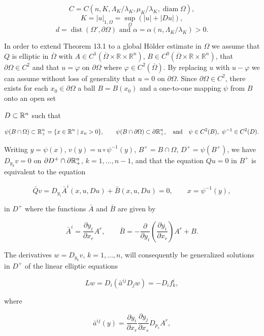 \[
C=C(n,K,\Lambda_K/\lambda_K,\mu_K/\lambda_K,\operatorname{diam}\Omega),
\]
\[
K=|u|_{1,\Omega}=\sup_{\Omega}(|u|+|Du|),
\]
\[
d=\operatorname{dist}(\Omega',\partial\Omega)\text{ and }\alpha=\alpha(n,\Lambda_K/\lambda_K)>0.
\]

In order to extend Theorem 13.1 to a global H\"older estimate in $\Omega$ we assume
that $Q$ is elliptic in $\overline{\Omega}$ with $A\in C^1(\overline{\Omega}\times\mathbb{R}\times\mathbb{R}^n)$, $B\in C^0(\overline{\Omega}\times\mathbb{R}\times\mathbb{R}^n)$, that $\partial\Omega\in C^2$
and that $u=\varphi$ on $\partial\Omega$ where $\varphi\in C^2(\overline{\Omega})$. By replacing $u$ with $u-\varphi$ we can assume
without loss of generality that $u=0$ on $\partial\Omega$. Since $\partial\Omega\in C^2$, there exists for each
$x_0\in\partial\Omega$ a ball $B=B(x_0)$ and a one-to-one mapping $\psi$ from $B$ onto an open set


$D \subset \mathbb{R}^n$ such that

\[
\psi(B \cap \Omega) \subset \mathbb{R}^n_+ = \{x \in \mathbb{R}^n \mid x_n > 0\},
\qquad
\psi(B \cap \partial \Omega) \subset \partial \mathbb{R}^n_+,
\quad \text{and} \quad
\psi \in C^2(B), \ \psi^{-1} \in C^2(D).
\]

Writing $y=\psi(x)$, $v(y)=u \circ \psi^{-1}(y)$, $B^+=B\cap\Omega$, $D^+=\psi(B^+)$, we have $D_{y_k}v=0$ on $\partial D^+ \cap \partial \mathbb{R}^n_+$, $k=1,\ldots,n-1$, and that the equation $Qu=0$ in $B^+$ is equivalent to the equation

\begin{equation}\tag{13.6}
\bar Q v = D_{y_i}\bar A^i(x,u,Du) + \bar B(x,u,Du)=0, \qquad x=\psi^{-1}(y),
\end{equation}

in $D^+$ where the functions $\bar A$ and $\bar B$ are given by

\[
\bar A^i = \frac{\partial y_i}{\partial x_r} A^r, \qquad
\bar B = -\frac{\partial}{\partial y_i}\!\left(\frac{\partial y_i}{\partial x_r}\right) A^r + B.
\]

The derivatives $w=D_{y_k}v$, $k=1,\ldots,n$, will consequently be generalized solutions in $D^+$ of the linear elliptic equations

\[
Lw = D_i(\bar a^{ij}D_j w) = -D_i f_k^i,
\]

where

\[
\bar a^{ij}(y)=\frac{\partial y_i}{\partial x_r}\frac{\partial y_j}{\partial x_s}D_{p_s}A^r,
\]

